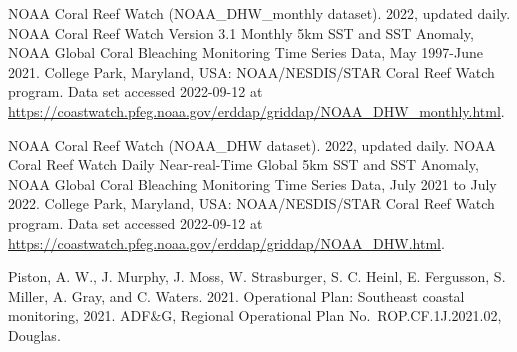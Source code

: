 \documentclass[
]{article}
\begin{document}
NOAA Coral Reef Watch (NOAA\_DHW\_monthly dataset). 2022, updated daily.
NOAA Coral Reef Watch Version 3.1 Monthly 5km SST and SST Anomaly, NOAA
Global Coral Bleaching Monitoring Time Series Data, May 1997-June 2021.
College Park, Maryland, USA: NOAA/NESDIS/STAR Coral Reef Watch program.
Data set accessed 2022-09-12 at
\url{https://coastwatch.pfeg.noaa.gov/erddap/griddap/NOAA_DHW_monthly.html}.

NOAA Coral Reef Watch (NOAA\_DHW dataset). 2022, updated daily. NOAA
Coral Reef Watch Daily Near-real-Time Global 5km SST and SST Anomaly,
NOAA Global Coral Bleaching Monitoring Time Series Data, July 2021 to
July 2022. College Park, Maryland, USA: NOAA/NESDIS/STAR Coral Reef
Watch program. Data set accessed 2022-09-12 at
\url{https://coastwatch.pfeg.noaa.gov/erddap/griddap/NOAA_DHW.html}.

Piston, A. W., J. Murphy, J. Moss, W. Strasburger, S. C. Heinl, E.
Fergusson, S. Miller, A. Gray, and C. Waters. 2021. Operational Plan:
Southeast coastal monitoring, 2021. ADF\&G, Regional Operational Plan
No.~ROP.CF.1J.2021.02, Douglas.
\end{document}
